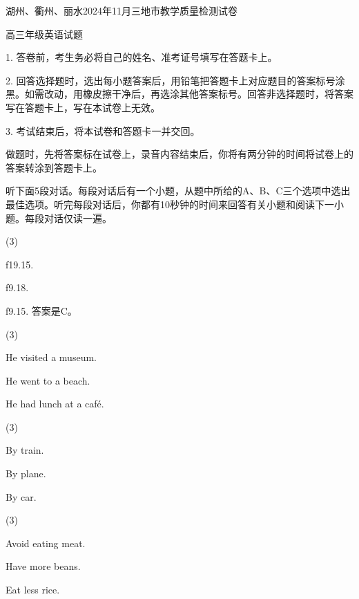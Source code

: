 \documentclass{英语试卷}
\begin{document}
\par 湖州、衢州、丽水2024年11月三地市教学质量检测试卷\par
\par 高三年级英语试题\par
\begin{notice}
\par 1. 答卷前，考生务必将自己的姓名、准考证号填写在答题卡上。\par
\par 2. 回答选择题时，选出每小题答案后，用铅笔把答题卡上对应题目的答案标号涂黑。如需改动，用橡皮擦干净后，再选涂其他答案标号。回答非选择题时，将答案写在答题卡上，写在本试卷上无效。\par
\par 3. 考试结束后，将本试卷和答题卡一并交回。\par
\end{notice}
\par 做题时，先将答案标在试卷上，录音内容结束后，你将有两分钟的时间将试卷上的答案转涂到答题卡上。\par
{}
\par 听下面5段对话。每段对话后有一个小题，从题中所给的A、B、C三个选项中选出最佳选项。听完每段对话后，你都有10秒钟的时间来回答有关小题和阅读下一小题。每段对话仅读一遍。\par
{}
\begin{choices}(3)
  \item f19.15.
  \item f9.18.
  \item f9.15. 答案是C。
\end{choices}
\begin{choices}(3)
  \item He visited a museum.
  \item He went to a beach.
  \item He had lunch at a café.
\end{choices}
\begin{choices}(3)
  \item By train.
  \item By plane.
  \item By car.
\end{choices}
\begin{choices}(3)
  \item Avoid eating meat.
  \item Have more beans.
  \item Eat less rice.
\end{choices}
\end{document}
